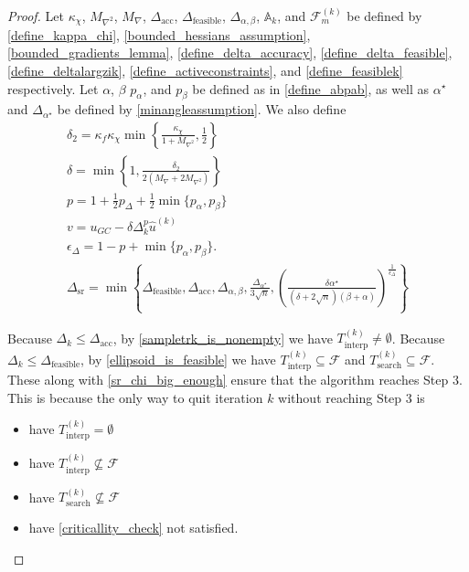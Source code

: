 \documentclass{article}
\theoremstyle{case}
\numberwithin{theorem}{subsection}
\newcommand{\activeconstraintsk}{{\mathbb A_{k}}}
\newcommand{\dacc}{{\Delta_{\textrm{acc}}}}
\newcommand{\deltalargzik}{{\Delta_{\alpha,\beta}}}
\newcommand{\dfeas}{{\Delta_{\textrm{feasible}}}}
\newcommand{\dk}{\Delta_k}
\newcommand{\dsr}{{\Delta_{\textrm{sr}}}}
\newcommand{\feasiblek}{{\mathcal F_m^{(k)}}}
\newcommand{\feasible}{{\mathcal F}}
\newcommand{\huk}{{{\hat u}^{(k)}}}
\newcommand{\maxgrad}{{M_{\nabla}}}
\newcommand{\maxhessian}{{M_{\nabla^2}}}
\newcommand{\minanglealpha}{{ \alpha^{\star} }}
\newcommand{\minangledelta}{{\Delta_{\alpha^{\star}}}}
\newcommand{\sampletrk}{{T_{\text{interp}}^{(k)}}}
\newcommand{\searchtrk}{{T_{\text{search}}^{(k)}}}
\begin{document}
\begin{proof}

Let
$\kappa_{\chi}$,
$\maxhessian$,
$\maxgrad$,
$\dacc$,
$\dfeas$,
$\deltalargzik$,
$\activeconstraintsk$,
and $\feasiblek$
be defined by
\cref{define_kappa_chi},
\cref{bounded_hessians_assumption},
\cref{bounded_gradients_lemma},
\cref{define_delta_accuracy},
\cref{define_delta_feasible},
\cref{define_deltalargzik},
\cref{define_activeconstraints},
and \cref{define_feasiblek}
respectively.
Let $\alpha$, $\beta$ $p_{\alpha}$, and $p_{\beta}$
be defined as in \cref{define_abpab}, as well as $\minanglealpha$ and $\minangledelta$ be defined by \cref{minangleassumption}.
We also define
\begin{align}
\delta_2 = \kappa_f \kappa_{\chi} \min\left\{ \frac{\kappa_{\chi}}{1 + \maxhessian}, \frac 1 2 \right\} \label{define_delta2} \\
\delta = \min\left\{1, \frac{\delta_2}{2\left(\maxgrad + 2\maxhessian\right)}\right\} \label{sr_define_delta} \\
p = 1 + \frac 1 2 p_{\Delta} + \frac 1 2\min\{p_{\alpha}, p_{\beta}\} \label{sr_def_p}\\
v = u_{GC} - \delta \dk^{p} \huk \label{define_v} \\
\epsilon_{\Delta} = 1-p+\min\{p_{\alpha}, p_{\beta}\}. \label{sr_def_epsilon_delta} \\
\dsr = \min\left\{
\dfeas,
\dacc,
\deltalargzik,
\frac{\minangledelta}{3\sqrt{n}},
\left(\frac{\delta \minanglealpha}{\left(\delta + 2\sqrt{n}\right)\left(\beta +\alpha\right)}\right)^{\frac 1 {\epsilon_{\Delta}}}
\right\} \label{define_delta_sufficient_reduction}
\end{align}

\color{red}
Because $\dk \le \dacc$, by \cref{sampletrk_is_nonempty} we have $\sampletrk \ne \emptyset$.
Because $\dk \le \dfeas$, by \cref{ellipsoid_is_feasible} we have $\sampletrk \subseteq \feasible$ and $\searchtrk \subseteq \feasible$.
These along with \cref{sr_chi_big_enough} ensure that the algorithm reaches Step 3.
This is because the only way to quit iteration $k$ without reaching Step 3 is
\begin{itemize}
\item have $\sampletrk = \emptyset$
\item have $\sampletrk \not \subseteq \feasible$
\item have $\searchtrk \not \subseteq \feasible$
\item have \cref{criticallity_check} not satisfied.
\end{itemize}
\color{black}


\end{proof}
\end{document}
